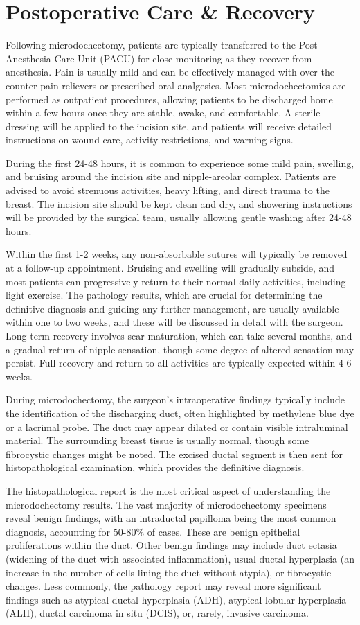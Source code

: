 \section*{Postoperative Care \& Recovery}
Following microdochectomy, patients are typically transferred to the Post-Anesthesia Care Unit (PACU) for close monitoring as they recover from anesthesia. Pain is usually mild and can be effectively managed with over-the-counter pain relievers or prescribed oral analgesics. Most microdochectomies are performed as outpatient procedures, allowing patients to be discharged home within a few hours once they are stable, awake, and comfortable. A sterile dressing will be applied to the incision site, and patients will receive detailed instructions on wound care, activity restrictions, and warning signs.

During the first 24-48 hours, it is common to experience some mild pain, swelling, and bruising around the incision site and nipple-areolar complex. Patients are advised to avoid strenuous activities, heavy lifting, and direct trauma to the breast. The incision site should be kept clean and dry, and showering instructions will be provided by the surgical team, usually allowing gentle washing after 24-48 hours. 

Within the first 1-2 weeks, any non-absorbable sutures will typically be removed at a follow-up appointment. Bruising and swelling will gradually subside, and most patients can progressively return to their normal daily activities, including light exercise. The pathology results, which are crucial for determining the definitive diagnosis and guiding any further management, are usually available within one to two weeks, and these will be discussed in detail with the surgeon. Long-term recovery involves scar maturation, which can take several months, and a gradual return of nipple sensation, though some degree of altered sensation may persist. Full recovery and return to all activities are typically expected within 4-6 weeks.

During microdochectomy, the surgeon's intraoperative findings typically include the identification of the discharging duct, often highlighted by methylene blue dye or a lacrimal probe. The duct may appear dilated or contain visible intraluminal material. The surrounding breast tissue is usually normal, though some fibrocystic changes might be noted. The excised ductal segment is then sent for histopathological examination, which provides the definitive diagnosis.

The histopathological report is the most critical aspect of understanding the microdochectomy results. The vast majority of microdochectomy specimens reveal benign findings, with an intraductal papilloma being the most common diagnosis, accounting for 50-80\% of cases. These are benign epithelial proliferations within the duct. Other benign findings may include duct ectasia (widening of the duct with associated inflammation), usual ductal hyperplasia (an increase in the number of cells lining the duct without atypia), or fibrocystic changes. Less commonly, the pathology report may reveal more significant findings such as atypical ductal hyperplasia (ADH), atypical lobular hyperplasia (ALH), ductal carcinoma in situ (DCIS), or, rarely, invasive carcinoma. 

